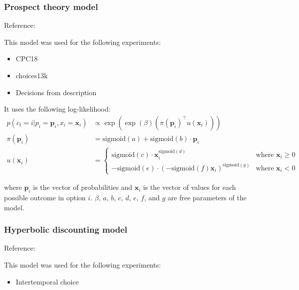 \documentclass[pdflatex,sn-nature]{sn-jnl}%
\theoremstyle{thmstyleone}%
\theoremstyle{thmstyletwo}%
\theoremstyle{thmstylethree}%
\begin{document}
\subsubsection*{Prospect theory model}

Reference: \cite{peterson2021using} 

\noindent This model was used for the following experiments:
\begin{itemize}
    \item CPC18
    \item choices13k
    \item Decisions from description
\end{itemize}

\noindent It uses the following log-likelihood:
\begin{align*}
    p(c_t = i | p_i = \mathbf{p}_i, x_i  = \mathbf{x}_i) &\propto \exp\left(\exp\left(\beta\right)\left(\pi\left(\mathbf{p}_i\right)^{\top} u\left(\mathbf{x}_i\right)\right) \right) \\
    \pi\left(\mathbf{p}_i\right) &= \text{sigmoid}\left(a\right) + \text{sigmoid}\left(b\right) \cdot\mathbf{p}_i\\
    u\left(\mathbf{x}_i\right) &= 
    \begin{cases} 
        \text{sigmoid}\left(c\right) \cdot \mathbf{x}_i^{\text{sigmoid}\left(d\right)} & \text{where } \mathbf{x}_i\geq 0\\
        -\text{sigmoid}\left(e\right) \cdot \left(-\text{sigmoid}\left(f\right)\mathbf{x}_i\right)^{\text{sigmoid}\left(g\right)}              & \text{where } \mathbf{x}_i < 0
    \end{cases}
\end{align*}

\noindent where $\mathbf{p}_i$ is the vector of probabilities and $\mathbf{x}_i$ is the vector of values for each possible outcome in option $i$. $\beta$, $a$, $b$, $c$, $d$, $e$, $f$, and $g$ are free parameters of the model.

\subsubsection*{Hyperbolic discounting model}

Reference: \cite{van2013towards} 

\noindent This model was used for the following experiments:
\begin{itemize}
    \item Intertemporal choice
\end{itemize}
\end{document}
